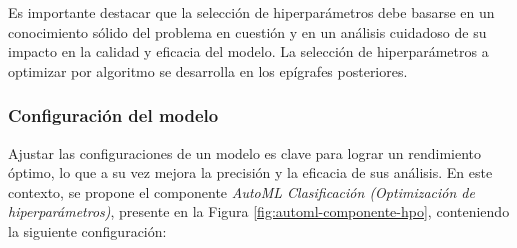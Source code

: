 Es importante destacar que la selección de hiperparámetros debe basarse en un conocimiento sólido del problema en cuestión y en un análisis cuidadoso de su impacto en la calidad y eficacia del modelo. La selección de hiperparámetros a optimizar por algoritmo se desarrolla en los epígrafes posteriores. 

\subsubsection*{Configuración del modelo}

Ajustar las configuraciones de un modelo es clave para lograr un rendimiento óptimo, lo que a su vez mejora la precisión y la eficacia de sus análisis. En este contexto, se propone el componente \textit{AutoML Clasificación (Optimización de hiperparámetros)}, presente en la Figura \ref{fig:automl-componente-hpo}, conteniendo la siguiente configuración:

